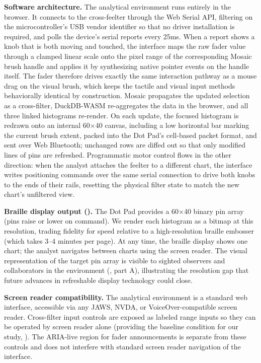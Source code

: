 \documentclass[12pt]{cmuthesis}
\begin{document}
\textbf{Software architecture.} The analytical environment runs entirely in the browser. It connects to the cross-feelter through the Web Serial API, filtering on the microcontroller's USB vendor identifier so that no driver installation is required, and polls the device's serial reports every 25ms. When a report shows a knob that is both moving and touched, the interface maps the raw fader value through a clamped linear scale onto the pixel range of the corresponding Mosaic brush handle and applies it by synthesizing native pointer events on the handle itself. The fader therefore drives exactly the same interaction pathway as a mouse drag on the visual brush, which keeps the tactile and visual input methods behaviorally identical by construction. Mosaic propagates the updated selection as a cross-filter, DuckDB-WASM re-aggregates the data in the browser, and all three linked histograms re-render. On each update, the focused histogram is redrawn onto an internal 60$\times$40 canvas, including a low horizontal bar marking the current brush extent, packed into the Dot Pad's cell-based packet format, and sent over Web Bluetooth; unchanged rows are diffed out so that only modified lines of pins are refreshed. Programmatic motor control flows in the other direction: when the analyst attaches the feelter to a different chart, the interface writes positioning commands over the same serial connection to drive both knobs to the ends of their rails, resetting the physical filter state to match the new chart's unfiltered view.

\textbf{Braille display output ().} The Dot Pad provides a 60$\times$40 binary pin array (pins raise or lower on command). We render each histogram as a bitmap at this resolution, trading fidelity for speed relative to a high-resolution braille embosser (which takes 3--4 minutes per page). At any time, the braille display shows one chart; the analyst navigates between charts using the screen reader. The visual representation of the target pin array is visible to sighted observers and collaborators in the environment (, part A), illustrating the resolution gap that future advances in refreshable display technology could close.

\textbf{Screen reader compatibility.} The analytical environment is a standard web interface, accessible via any JAWS, NVDA, or VoiceOver-compatible screen reader. Cross-filter input controls are exposed as labeled range inputs so they can be operated by screen reader alone (providing the baseline condition for our study, ). The ARIA-live region for fader announcements is separate from these controls and does not interfere with standard screen reader navigation of the interface.
\end{document}
